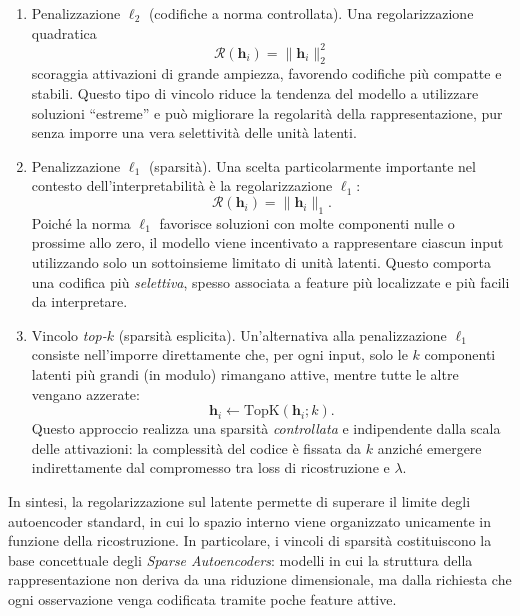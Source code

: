 \begin{enumerate}[label=\roman*.]
    \item Penalizzazione $\ell_2$ (codifiche a norma controllata).
    Una regolarizzazione quadratica
    \begin{equation}
        \mathcal{R}(\mathbf{h}_i) = \|\mathbf{h}_i\|_2^2
    \end{equation}
    scoraggia attivazioni di grande ampiezza, favorendo codifiche più compatte e
    stabili. Questo tipo di vincolo riduce la tendenza del modello a utilizzare
    soluzioni ``estreme'' e può migliorare la regolarità della rappresentazione,
    pur senza imporre una vera selettività delle unità latenti.

    \item Penalizzazione $\ell_1$ (sparsità).
    Una scelta particolarmente importante nel contesto dell'interpretabilità è la
    regolarizzazione $\ell_1$:
    \begin{equation}
        \mathcal{R}(\mathbf{h}_i) = \|\mathbf{h}_i\|_1.
    \end{equation}
    Poiché la norma $\ell_1$ favorisce soluzioni con molte componenti nulle o
    prossime allo zero, il modello viene incentivato a rappresentare ciascun input
    utilizzando solo un sottoinsieme limitato di unità latenti. Questo comporta una
    codifica più \emph{selettiva}, spesso associata a feature più localizzate e più
    facili da interpretare.

    \item Vincolo \textit{top-$k$} (sparsità esplicita).
    Un'alternativa alla penalizzazione $\ell_1$ consiste nell'imporre direttamente
    che, per ogni input, solo le $k$ componenti latenti più grandi (in modulo)
    rimangano attive, mentre tutte le altre vengano azzerate:
    \begin{equation}
        \mathbf{h}_i \leftarrow \mathrm{TopK}(\mathbf{h}_i; k).
    \end{equation}
    Questo approccio realizza una sparsità \emph{controllata} e indipendente dalla
    scala delle attivazioni: la complessità del codice è fissata da $k$ anziché
    emergere indirettamente dal compromesso tra loss di ricostruzione e $\lambda$.
\end{enumerate}

In sintesi, la regolarizzazione sul latente permette di superare il limite degli
autoencoder standard, in cui lo spazio interno viene organizzato unicamente in
funzione della ricostruzione. In particolare, i vincoli di sparsità costituiscono
la base concettuale degli \textit{Sparse Autoencoders}: modelli in cui la
struttura della rappresentazione non deriva da una riduzione dimensionale, ma
dalla richiesta che ogni osservazione venga codificata tramite poche feature
attive.
